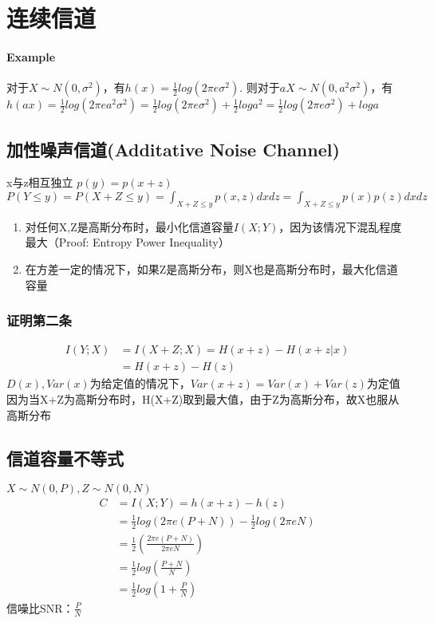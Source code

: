 \documentclass[a4paper, 12pt]{article}
\begin{document}
    \section{连续信道}
    \paragraph{Example}
    对于$X \sim N(0, \sigma^2)$，有$h(x) = \frac{1}{2}log(2 \pi e \sigma^2)$.  
    \newline 则对于$aX \sim N(0, a^2 \sigma^2)$，有$h(ax) = \frac{1}{2}log(2 \pi e a^2 \sigma^2) = \frac{1}{2}log(2\pi e \sigma^2)+\frac{1}{2}log a^2 = \frac{1}{2}log(2\pi e \sigma^2) + loga$
    \subsection{加性噪声信道(Additative Noise Channel)}
    x与z相互独立
    \newline $p(y) = p(x+z)$
    \newline $P(Y \le y) = P(X+Z \le y) = \int_{X+Z \le y}p(x,z)dxdz = \int_{X+Z \le y}p(x)p(z)dxdz$
    \begin{enumerate}
        \item 对任何X,Z是高斯分布时，最小化信道容量$I(X;Y)$，因为该情况下混乱程度最大（Proof: Entropy Power Inequality）
        \item 在方差一定的情况下，如果Z是高斯分布，则X也是高斯分布时，最大化信道容量
    \end{enumerate}
    \subsubsection{证明第二条}
    \begin{equation}
        \begin{aligned}
            I(Y;X) &= I(X+Z; X) = H(x+z) - H(x+z|x)\\
            &=H(x+z)-H(z)
        \end{aligned}
    \end{equation}
    $D(x), Var(x)$为给定值的情况下，$Var(x+z)=Var(x)+Var(z)$为定值
    \newline 因为当X+Z为高斯分布时，H(X+Z)取到最大值，由于Z为高斯分布，故X也服从高斯分布

    \subsection{信道容量不等式}
    $X \sim N(0, P), Z \sim N(0, N)$
    \begin{equation}
        \begin{aligned}
            C &= I(X; Y) = h(x+z) - h(z)\\
            &= \frac{1}{2}log(2 \pi e (P+N)) - \frac{1}{2}log(2 \pi eN)\\
            &= \frac{1}{2}(\frac{2\pi e(P+N)}{2\pi eN})\\
            &= \frac{1}{2}log(\frac{P+N}{N})\\
            &= \frac{1}{2}log(1+\frac{P}{N})
        \end{aligned}
    \end{equation}
    信噪比SNR：$\frac{P}{N}$
\end{document}
